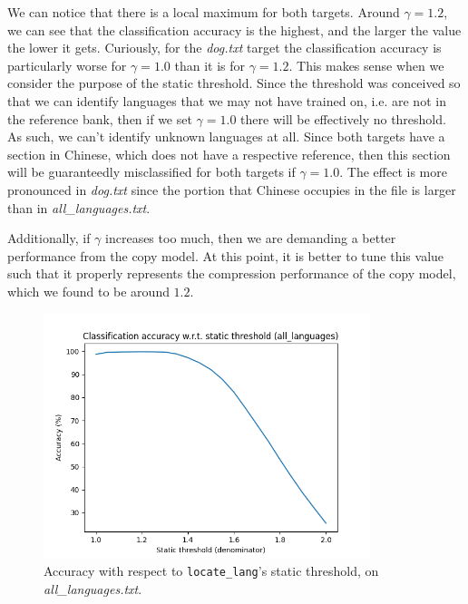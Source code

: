 \documentclass{article}
\begin{document}
We can notice that there is a local maximum for both targets.
Around $\gamma = 1.2$, we can see that the classification accuracy is the highest, and the larger the value the lower it gets.
Curiously, for the \textit{dog.txt} target the classification accuracy is particularly worse for $\gamma = 1.0$ than it is for $\gamma = 1.2$.
This makes sense when we consider the purpose of the static threshold.
Since the threshold was conceived so that we can identify languages that we may not have trained on, i.e. are not in the reference bank, then if we set $\gamma = 1.0$ there will be effectively no threshold.
As such, we can't identify unknown languages at all.
Since both targets have a section in Chinese, which does not have a respective reference, then this section will be guaranteedly misclassified for both targets if $\gamma = 1.0$.
The effect is more pronounced in \textit{dog.txt} since the portion that Chinese occupies in the file is larger than in \textit{all\_languages.txt}.

Additionally, if $\gamma$ increases too much, then we are demanding a better performance from the copy model.
At this point, it is better to tune this value such that it properly represents the compression performance of the copy model, which we found to be around $1.2$.

\begin{figure}
    \centering
    \includegraphics[width=0.85\textwidth]{../results/all_languages/ll-s.png}
    \caption{Accuracy with respect to \texttt{locate\_lang}'s static threshold, on \textit{all\_languages.txt}.}
    \label{fig:ll_s_all_languages}
\end{figure}
\end{document}
